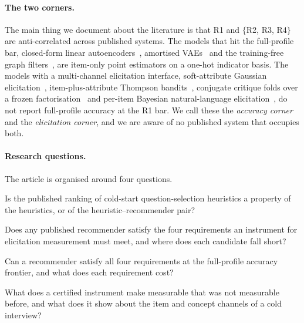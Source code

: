 \documentclass[manuscript,screen,review]{acmart}
\begin{document}
\paragraph{The two corners.} The main thing we document about the literature is that R1 and $\{$R2, R3, R4$\}$ are anti-correlated across published systems. The models that hit the full-profile bar, closed-form linear autoencoders~\citep{steck2019ease,steck2020edlae}, amortised VAEs~\citep{liang2018variational,ren2020recvae} and the training-free graph filters~\citep{shen2021gfcf,choi2023bspm,park2024turbocf}, are item-only point estimators on a one-hot indicator basis. The models with a multi-channel elicitation interface, soft-attribute Gaussian elicitation~\citep{biyik2023soft}, item-plus-attribute Thompson bandits~\citep{li2021seamlessly}, conjugate critique folds over a frozen factorisation~\citep{toroghi2023bcie} and per-item Bayesian natural-language elicitation~\citep{austin2024bayesian}, do not report full-profile accuracy at the R1 bar. We call these the \emph{accuracy corner} and the \emph{elicitation corner}, and we are aware of no published system that occupies both.

\paragraph{Research questions.} The article is organised around four questions.
\begin{description}[leftmargin=3.2em,itemsep=2pt]
  \item[RQ1] Is the published ranking of cold-start question-selection heuristics a property of the heuristics, or of the heuristic--recommender pair?
  \item[RQ2] Does any published recommender satisfy the four requirements an instrument for elicitation measurement must meet, and where does each candidate fall short?
  \item[RQ3] Can a recommender satisfy all four requirements at the full-profile accuracy frontier, and what does each requirement cost?
  \item[RQ4] What does a certified instrument make measurable that was not measurable before, and what does it show about the item and concept channels of a cold interview?
\end{description}
\end{document}
